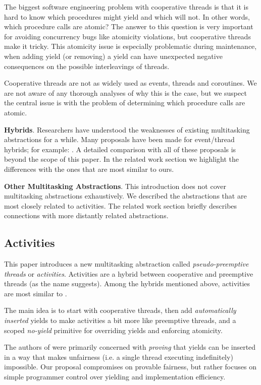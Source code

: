 \documentclass[10pt,preprint]{sigplanconf}
\begin{document}
The biggest software engineering problem with cooperative threads is that it is hard to know which procedures might yield and which will not.
In other words, which procedure calls are atomic?
The answer to this question is very important for avoiding concurrency bugs like atomicity violations, but cooperative threads make it tricky.
This atomicity issue is especially problematic during maintenance, when adding yield (or removing) a yield can have unexpected negative consequences on the possible interleavings of threads.

Cooperative threads are not as widely used as events, threads and coroutines.
We are not aware of any thorough analyses of why this is the case, but we suspect the central issue is with the problem of determining which procedure calls are atomic.

\textbf{Hybrids}.
Researchers have understood the weaknesses of existing multitasking abstractions for a while.
Many proposals have been made for event/thread hybrids; for example: \cite{Boudol2007, Boussinot2006, Cunningham2005, Dabrowski2006, Fischer2007, Kerneis2014, Krohn2007, Li2007, Behren2003}.
A detailed comparison with all of these proposals is beyond the scope of this paper.
In the related work section we highlight the differences with the ones that are most similar to ours.

\textbf{Other Multitasking Abstractions}.
This introduction does not cover multitasking abstractions exhaustively.
We described the abstractions that are most closely related to activities.
The related work section briefly describes connections with more distantly related abstractions.

\subsection{Activities}

This paper introduces a new multitasking abstraction called \emph{pseudo-preemptive threads} or \emph{activities}.
Activities are a hybrid between cooperative and preemptive threads (as the name suggests).
Among the hybrids mentioned above, activities are most similar to \cite{Boudol2007}.

The main idea is to start with cooperative threads, then add \emph{automatically inserted} yields to make activities a bit more like preemptive threads, and a scoped \emph{no-yield} primitive for overriding yields and enforcing atomicity.

The authors of \cite{Boudol2007} were primarily concerned with \emph{proving} that yields can be inserted in a way that makes unfairness (i.e. a single thread executing indefinitely) impossible.
Our proposal compromises on provable fairness, but rather focuses on simple programmer control over yielding and implementation efficiency.
\end{document}
